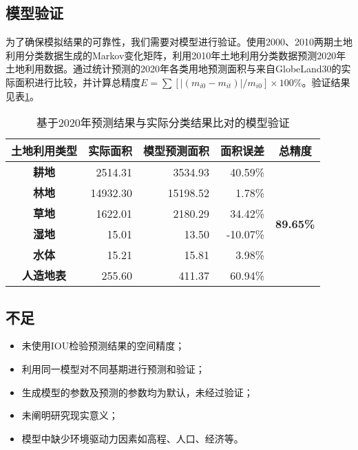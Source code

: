 \documentclass[10pt,aspectratio=169]{beamer} %
\begin{document}
	\subsection{模型验证}
	\begin{frame}[c]{\secname}{\subsecname}
		为了确保模拟结果的可靠性，我们需要对模型进行验证。使用2000、2010两期土地利用分类数据生成的Markov变化矩阵，利用2010年土地利用分类数据预测2020年土地利用数据。通过统计预测的2020年各类用地预测面积与来自GlobeLand30的实际面积进行比较，并计算总精度$
		E=\sum{\left[ \left| \left( m_{i0}-m_{it} \right) \right|/m_{i0} \right]}\times 100\%
		$。验证结果见表\ref{Table.4}。
	\begin{table}[htbp]
		\centering
		\caption{基于2020年预测结果与实际分类结果比对的模型验证}
		\begin{tabular}{crrrc}
			\toprule
			\textbf{土地利用类型} &
			\multicolumn{1}{c}{\textbf{实际面积}} &
			\multicolumn{1}{c}{\textbf{模型预测面积}} &
			\multicolumn{1}{c}{\textbf{面积误差}} &
			\textbf{总精度}
			\\
			\midrule
			\textbf{耕地} &
			2514.31 &
			3534.93 &
			40.59\% &
			\multirow{6}[2]{*}{\textbf{89.65\%}}
			\\
			\textbf{林地} &
			14932.30 &
			15198.52 &
			1.78\% &
			
			\\
			\textbf{草地} &
			1622.01 &
			2180.29 &
			34.42\% &
			
			\\
			\textbf{湿地} &
			15.01 &
			13.50 &
			-10.07\% &
			
			\\
			\textbf{水体} &
			15.21 &
			15.81 &
			3.98\% &
			
			\\
			\textbf{人造地表} &
			255.60 &
			411.37 &
			60.94\% &
			
			\\
			\bottomrule
		\end{tabular}%
		\label{Table.4}%
	\end{table}%
	
	\end{frame}

	\subsection{不足}
	\begin{frame}{\secname}{\subsecname}
		\large\begin{itemize}
			\item 未使用IOU检验预测结果的空间精度；
			\item 利用同一模型对不同基期进行预测和验证；
			\item 生成模型的参数及预测的参数均为默认，未经过验证；
			\item 未阐明研究现实意义；
			\item 模型中缺少环境驱动力因素如高程、人口、经济等。
			
		\end{itemize}
	\end{frame}
	
\end{document}
